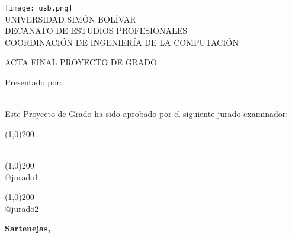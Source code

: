 \begin{titlepage}
\begin{center}

\texttt{[image: usb.png]} \\

\textsc {\large UNIVERSIDAD SIMÓN BOLÍVAR} \\
\textsc{DECANATO DE ESTUDIOS PROFESIONALES\\
COORDINACIÓN DE INGENIERÍA DE LA COMPUTACIÓN}

\bigskip
\bigskip
\bigskip
\bigskip
\bigskip
\bigskip

\textsc{ACTA FINAL PROYECTO DE GRADO}

\bigskip
\bigskip

\textsc{\textbf{\projectTitle}}

\bigskip
\bigskip
\bigskip
\bigskip

\begin{minipage}{\textwidth}
\centering
Presentado por: \\
\textsc{\textbf{\authorName}} \\

\bigskip
\bigskip
\bigskip

Este Proyecto de Grado ha sido aprobado por el siguiente jurado examinador: \\

\bigskip
\bigskip

{   %
\newcommand{\juryinfo}[1]{
\line(1,0){200} \\
#1 \\

\bigskip
\bigskip
}

\juryinfo{\tutorName}
\juryinfo{@jurado1}
\juryinfo{@jurado2}
}

\end{minipage}
\vfill

{\large \bfseries Sartenejas, }

\end{center}
\end{titlepage}

